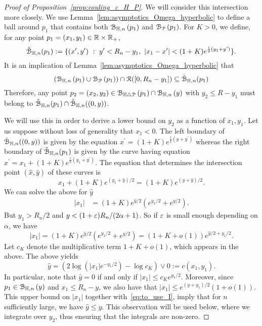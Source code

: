 \begin{proof}[Proof of Proposition~\ref{prop:couling_c_H_P}]
We will consider this intersection more closely. We use Lemma~\ref{lem:asymptotics_Omega_hyperbolic} to define a ball around $p_1$ that contains both 
${\mathcal B}_{\mathbb{H},n}\left(p_1\right)$ and ${\mathcal B}_{{\mathcal P}}\left(p_1\right)$.
For $K > 0$, we define, for any point $p_1=(x_1,y_1) \in {\ensuremath{\mathbb R}} \times {\ensuremath{\mathbb R}}_+$,
\begin{equation}\label{eq:def_fatball}
	\check{{\mathcal B}}_{\mathbb{H},n}(p_1) : = \{ (x',y') \ : \  y' < R_n - y_1, \ | x_1 - x'| < (1+K) e^{\frac{1}{2} (y_1 + y')}  \}.
\end{equation}
It is an implication of Lemma~\ref{lem:asymptotics_Omega_hyperbolic}  that 
\begin{equation*} %
(\BallHyp{p_1} \cup \BallPo{p_1}) \cap \Rcal([0, R_n - y_1]) \subseteq \FatBallHyp{p_1}
\end{equation*}
Therefore, any point $p_2 = (x_2,y_2) \in {\mathcal B}_{\mathbb{H} \bigtriangleup {\mathcal P}}\left(p_1\right) \cap {\mathcal B}_{\mathbb{H},n}\left(y\right)$ with 
$y_2 \leq R-y_1$ must belong to $\check{{\mathcal B}}_{\mathbb{H},n}(p_1) \cap \check{{\mathcal B}}_{\mathbb{H},n}((0,y))$.

We will use this in order to derive a lower bound on $y_2$ as a function of $x_1, y_1$. 
Let us suppose without loss of generality that $x_1 < 0$. 
The left boundary of $\check{{\mathcal B}}_{\mathbb{H},n}((0,y))$ is given by the equation 
$x^\prime = (1+K)e^{\frac{1}{2} (y + y^\prime)}$ whereas the right boundary of $\check{{\mathcal B}}_{\mathbb{H},n}(p_1)$ is given by the curve having equation $x^\prime = x_1 + (1+ K)e^{\frac{1}{2} (y_1 + y^\prime)}.$
The equation that determines the intersection point $(\hat{x},\hat{y})$ of these curves  is
\[
	x_1 + (1+K)e^{(y_1 + \hat{y})/2}= (1+K) e^{(y + \hat{y})/2}.
\]
We can solve the above for $\hat{y}$  
\begin{equation*} 
\begin{split}
|x_1| &=(1+K) e^{\hat{y}/2} \left( e^{y_1/2} + e^{y/2} \right).
\end{split}
\end{equation*}
But $y_1 > R_n/2$ and $y< (1+\varepsilon) R_n /(2\alpha +1)$. So if $\varepsilon$ is small enough depending on $\alpha$, we have 
$$ |x_1| =(1+K) e^{\hat{y}/2} \left( e^{y_1/2} + e^{y/2} \right) = (1+K+o(1))e^{\hat{y}/2 + y_1/2}. $$
Let $c_K$ denote the multiplicative term $1+ K+o(1)$, which appears in the above.
The above yields
\begin{equation} \label{eq:to_use_I}
\hat{y}= \left(2 \log(|x_1|e^{-y_1/2}) - \log c_K \right) \vee 0 := c(x_1,y_1). 
\end{equation}
In particular, note that $\hat{y} = 0$ if and only if $|x_1| \leq c_K e^{y_1/2}$.  
Moreover, since $p_1 \in {\mathcal B}_{\mathbb{H},n}\left(y\right)$ and $x_1 \leq R_n - y$, we also have that 
$|x_1| \leq e^{(y+y_1)/2} (1+o(1))$. This upper bound on $|x_1|$ together with~\eqref{eq:to_use_I}, imply that for $n$ sufficiently large, we have $\hat{y} \leq y$. This observation will be used below, where 
we integrate over $y_2$, thus ensuring that the integrals are non-zero. 


\end{proof}
